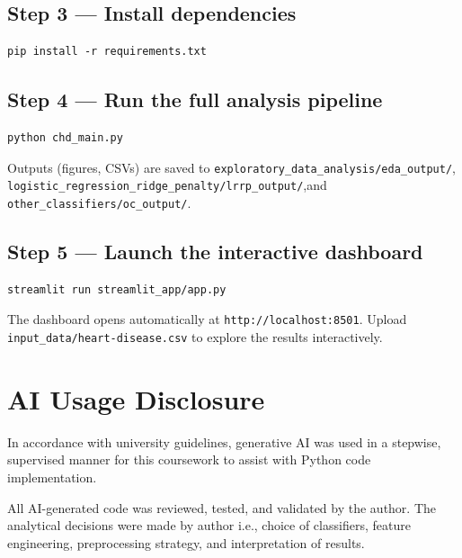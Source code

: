 \documentclass[12pt,a4paper]{article}
\begin{document}
\begin{appendices}
\subsection*{Step 3 — Install dependencies}
\begin{lstlisting}
pip install -r requirements.txt
\end{lstlisting}

\subsection*{Step 4 — Run the full analysis pipeline}
\begin{lstlisting}
python chd_main.py
\end{lstlisting}
\noindent Outputs (figures, CSVs) are saved to
\texttt{exploratory\_data\_analysis/eda\_output/},\newline
\texttt{logistic\_regression\_ridge\_penalty/lrrp\_output/},\newline and
\texttt{other\_classifiers/oc\_output/}.

\subsection*{Step 5 — Launch the interactive dashboard}
\begin{lstlisting}
streamlit run streamlit_app/app.py
\end{lstlisting}
\noindent The dashboard opens automatically at \texttt{http://localhost:8501}.\newline
Upload \texttt{input\_data/heart-disease.csv} to explore the results interactively.

\section{AI Usage Disclosure}

In accordance with university guidelines, generative AI 
was used in a stepwise, supervised manner for this coursework
to assist with Python code implementation.

\noindent All AI-generated code was reviewed, tested, and validated by
the author. The analytical decisions were made by author i.e., choice of
classifiers, feature engineering, preprocessing strategy, and
interpretation of results. 

\end{appendices}
\end{document}
